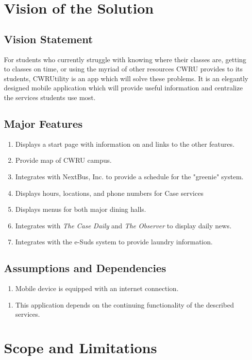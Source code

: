 \documentclass[pdftex,12pt,letter]{article}
\begin{document}
\section{Vision of the Solution}
\subsection{Vision Statement}
For students who currently struggle with knowing where their classes are, getting to classes on time, or using the myriad of other resources CWRU provides to its students, CWRUtility is an app which will solve these problems. It is an elegantly designed mobile application which will provide useful information and centralize the services students use most.
\subsection{Major Features}
\begin{enumerate}[FE-1:]
\item Displays a start page with information on and links to the other features.
\item Provide map of CWRU campus.
\item Integrates with NextBus, Inc. to provide a schedule for the "greenie" system.
\item Displays hours, locations, and phone numbers for Case services
\item Displays menus for both major dining halls.
\item Integrates with \emph{The Case Daily} and \emph{The Observer} to display daily news.
\item Integrates with the e-Suds system to provide laundry information.
\end{enumerate} 
\subsection{Assumptions and Dependencies}
\begin{enumerate}[{A}S-1:]
\item Mobile device is equipped with an internet connection.
\end{enumerate}
\begin{enumerate}[DE-1:]
\item This application depends on the continuing functionality of the described services.
\end{enumerate}
\section{Scope and Limitations}
\end{document}
